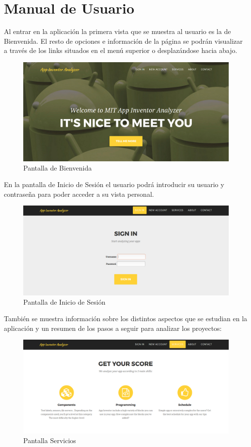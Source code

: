 \documentclass[a4paper, 12pt]{book}
\begin{document}
\section{Manual de Usuario} 
\label{sec:manualUsuario}
Al entrar en la aplicación la primera vista que se muestra al usuario es la de Bienvenida. El resto de opciones e información de la página se podrán visualizar a través de los links situados en el menú superior o desplazándose hacia abajo.
\begin{figure}[H]
  \centering
  \includegraphics[width=\linewidth, keepaspectratio]{img/VistaPrincipal}
  \caption{Pantalla de Bienvenida}
  \label{fig:VistaPrincipal}
\end{figure}
En la pantalla de Inicio de Sesión el usuario podrá introducir su usuario y contraseña para poder acceder a su vista personal. 
\begin{figure}[H]
  \centering
  \includegraphics[width=\linewidth, keepaspectratio]{img/VistaPrincipal2}
  \caption{Pantalla de Inicio de Sesión}
  \label{fig:VistaPrincipal2}
\end{figure}
También se muestra información sobre los distintos aspectos que se estudian en la aplicación y un resumen de los pasos a seguir para analizar los proyectos:
\begin{figure}[H]
  \centering
  \includegraphics[width=\linewidth, keepaspectratio]{img/VistaPrincipal3}
  \caption{Pantalla Servicios}
  \label{fig:VistaPrincipal3}
\end{figure}
\end{document}
